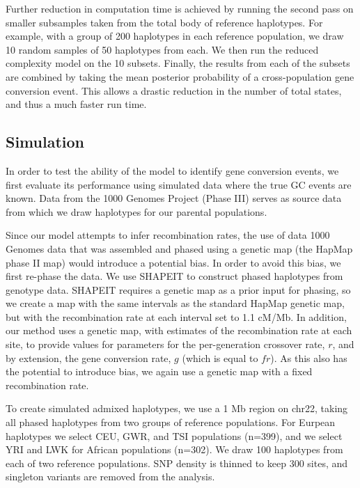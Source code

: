Further reduction in computation time is achieved by running the second pass on smaller subsamples taken from the total body of reference haplotypes.
For example, with a group of 200 haplotypes in each reference population, we draw 10 random samples of 50 haplotypes from each.
We then run the reduced complexity model on the 10 subsets.
Finally, the results from each of the subsets are combined by taking the mean posterior probability of a cross-population gene conversion event.
This allows a drastic reduction in the number of total states, and thus a much faster run time.


\subsection{Simulation}
In order to test the ability of the model to identify gene conversion events, we first evaluate its performance using simulated data where the true GC events are known.
Data from the 1000 Genomes Project (Phase III\cite{1000G2015}) serves as source data from which we draw haplotypes for our parental populations.

Since our model attempts to infer recombination rates, the use of data 1000 Genomes data that was assembled and phased using a genetic map (the HapMap phase II map\cite{hapmap2007}) would introduce a potential bias.
In order to avoid this bias, we first re-phase the data.
We use SHAPEIT\cite{Delaneau2013} to construct phased haplotypes from genotype data.
SHAPEIT requires a genetic map as a prior input for phasing, so we create a map with the same intervals as the standard HapMap genetic map, but with the recombination rate at each interval set to 1.1 cM/Mb.
In addition, our method uses a genetic map, with estimates of the recombination rate at each site, to provide values for parameters for the per-generation crossover rate, $r$, and by extension, the gene conversion rate, $g$ (which is equal to $f r$).
As this also has the potential to introduce bias, we again use a genetic map with a fixed recombination rate.

To create simulated admixed haplotypes, we use a 1 Mb region on chr22, taking all phased haplotypes from two groups of reference populations.
For Eurpean haplotypes we select CEU, GWR, and TSI populations (n=399), and we select YRI and LWK for African populations (n=302).
We draw 100 haplotypes from each of two reference populations.
SNP density is thinned to keep 300 sites, and singleton variants are removed from the analysis.

